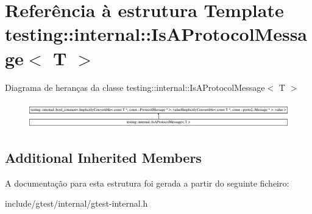 \hypertarget{structtesting_1_1internal_1_1IsAProtocolMessage}{\section{Referência à estrutura Template testing\-:\-:internal\-:\-:Is\-A\-Protocol\-Message$<$ T $>$}
\label{structtesting_1_1internal_1_1IsAProtocolMessage}
}
Diagrama de heranças da classe testing\-:\-:internal\-:\-:Is\-A\-Protocol\-Message$<$ T $>$\begin{figure}[H]
\begin{center}
\leavevmode
\includegraphics[height=1.132457cm]{structtesting_1_1internal_1_1IsAProtocolMessage}
\end{center}
\end{figure}
\subsection*{Additional Inherited Members}


A documentação para esta estrutura foi gerada a partir do seguinte ficheiro\-:\begin{DoxyCompactItemize}
\item 
include/gtest/internal/gtest-\/internal.\-h\end{DoxyCompactItemize}
